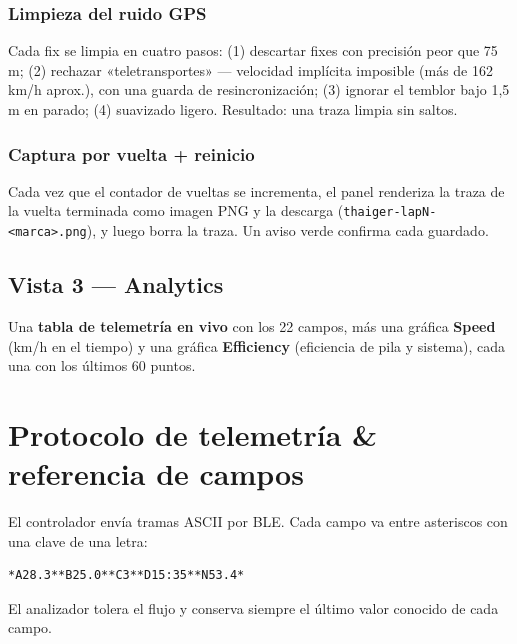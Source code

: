 \documentclass[11pt,a4paper,oneside]{report}
\newcommand{\code}[1]{\texttt{#1}}
\begin{document}
\subsubsection{Limpieza del ruido GPS}
Cada fix se limpia en cuatro pasos: (1) descartar fixes con precisión peor que 75 m;
(2) rechazar «teletransportes» --- velocidad implícita imposible (más de 162 km/h
aprox.), con una guarda de resincronización; (3) ignorar el temblor bajo 1,5 m en
parado; (4) suavizado ligero. Resultado: una traza limpia sin saltos.

\subsubsection{Captura por vuelta + reinicio}
Cada vez que el contador de vueltas se incrementa, el panel renderiza la traza de la
vuelta terminada como imagen PNG y la descarga (\code{thaiger-lapN-<marca>.png}),
y luego borra la traza. Un aviso verde confirma cada guardado.

\subsection{Vista 3 --- Analytics}
Una \textbf{tabla de telemetría en vivo} con los 22 campos, más una gráfica
\textbf{Speed} (km/h en el tiempo) y una gráfica \textbf{Efficiency} (eficiencia de
pila y sistema), cada una con los últimos 60 puntos.

\section{Protocolo de telemetría \& referencia de campos}
El controlador envía tramas ASCII por BLE. Cada campo va entre asteriscos con una
clave de una letra:

\begin{lstlisting}
*A28.3**B25.0**C3**D15:35**N53.4*
\end{lstlisting}
El analizador tolera el flujo y conserva siempre el último valor conocido de cada
campo.
\end{document}
